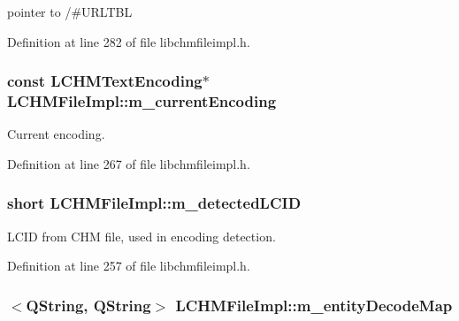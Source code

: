 pointer to /\#\+U\+R\+L\+T\+B\+L 



Definition at line 282 of file libchmfileimpl.\+h.

\hypertarget{classLCHMFileImpl_a365b502e727dd2202dec204815d23c50}{
\subsubsection[{m\+\_\+current\+Encoding}]{\setlength{\rightskip}{0pt plus 5cm}const {\bf L\+C\+H\+M\+Text\+Encoding}$\ast$ L\+C\+H\+M\+File\+Impl\+::m\+\_\+current\+Encoding}}\label{classLCHMFileImpl_a365b502e727dd2202dec204815d23c50}


Current encoding. 



Definition at line 267 of file libchmfileimpl.\+h.

\hypertarget{classLCHMFileImpl_a6d5c5705a3c148206aae29da01555ad1}{
\subsubsection[{m\+\_\+detected\+L\+C\+I\+D}]{\setlength{\rightskip}{0pt plus 5cm}short L\+C\+H\+M\+File\+Impl\+::m\+\_\+detected\+L\+C\+I\+D}}\label{classLCHMFileImpl_a6d5c5705a3c148206aae29da01555ad1}


L\+C\+I\+D from C\+H\+M file, used in encoding detection. 



Definition at line 257 of file libchmfileimpl.\+h.

\hypertarget{classLCHMFileImpl_ae00b1b33fde26e719bc22207c11e589f}{
\subsubsection[{m\+\_\+entity\+Decode\+Map}]{$<$Q\+String, Q\+String$>$ L\+C\+H\+M\+File\+Impl\+::m\+\_\+entity\+Decode\+Map}}\label{classLCHMFileImpl_ae00b1b33fde26e719bc22207c11e589f}


